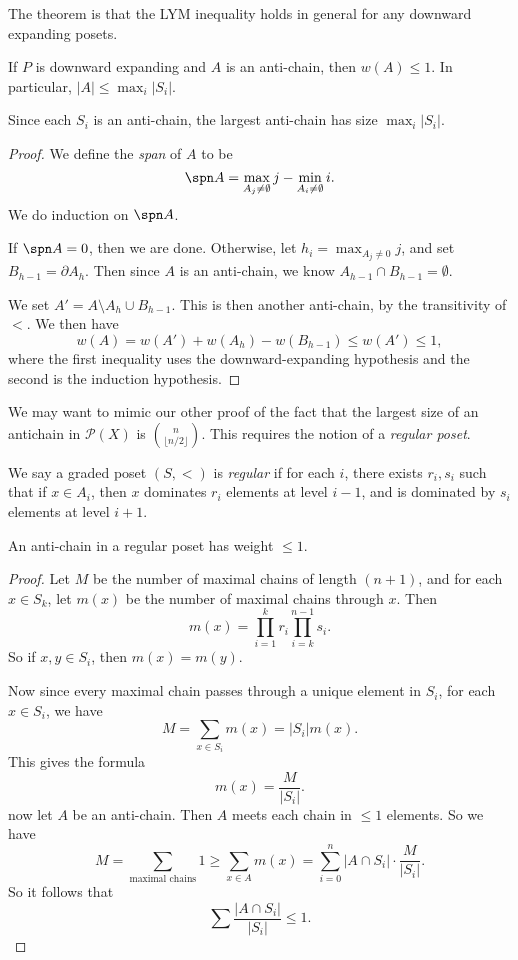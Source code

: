 \documentclass[a4paper]{article}
\begin{document}
The theorem is that the LYM inequality holds in general for any downward expanding posets.
\begin{thm}
  If $P$ is downward expanding and $A$ is an anti-chain, then $w(A) \leq 1$. In particular, $|A| \leq \max_i |S_i|$.

  Since each $S_i$ is an anti-chain, the largest anti-chain has size $\max_i |S_i|$.
\end{thm}

\begin{proof}
  We define the \emph{span} of $A$ to be
  \[
    \spn A = \max_{A_j \not= \emptyset} j - \min_{A_i \not= \emptyset} i.
  \]
  We do induction on $\spn A$.

  If $\spn A = 0$, then we are done. Otherwise, let $h_i = \max_{A_j \not= 0} j$, and set $B_{h - 1} = \partial A_h$. Then since $A$ is an anti-chain, we know $A_{h - 1} \cap B_{h - 1} = \emptyset$.

  We set $A' = A \setminus A_h \cup B_{h - 1}$. This is then another anti-chain, by the transitivity of $<$. We then have
  \[
    w(A) = w(A') + w(A_h) - w(B_{h - 1}) \leq w(A') \leq 1,
  \]
  where the first inequality uses the downward-expanding hypothesis and the second is the induction hypothesis.
\end{proof}

We may want to mimic our other proof of the fact that the largest size of an antichain in $\mathcal{P}(X)$ is $\binom{n}{\lfloor n/2\rfloor}$. This requires the notion of a \emph{regular poset}. 

\begin{defi}
  We say a graded poset $(S, <)$ is \emph{regular} if for each $i$, there exists $r_i, s_i$ such that if $x \in A_i$, then $x$ dominates $r_i$ elements at level $i - 1$, and is dominated by $s_i$ elements at level $i + 1$.
\end{defi}

\begin{prop}
  An anti-chain in a regular poset has weight $\leq 1$.
\end{prop}

\begin{proof}
  Let $M$ be the number of maximal chains of length $(n + 1)$, and for each $x \in S_k$, let $m(x)$ be the number of maximal chains through $x$. Then
  \[
    m(x) = \prod_{i = 1}^k r_i \prod_{i = k}^{n - 1} s_i.
  \]
  So if $x, y \in S_i$, then $m(x) = m(y)$.

  Now since every maximal chain passes through a unique element in $S_i$, for each $x \in S_i$, we have
  \[
    M = \sum_{x \in S_i} m(x) = |S_i| m(x).
  \]
  This gives the formula
  \[
    m(x) = \frac{M}{|S_i|}.
  \]
  now let $A$ be an anti-chain. Then $A$ meets each chain in $\leq 1$ elements.  So we have
  \[
    M = \sum_{\text{maximal chains}} 1 \geq \sum_{x \in A} m(x) = \sum_{i = 0}^n |A \cap S_i| \cdot \frac{M}{|S_i|}.
  \]
  So it follows that
  \[
    \sum \frac{|A \cap S_i|}{|S_i|} \leq 1.
  \]
\end{proof}
\end{document}
